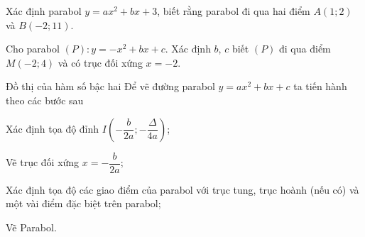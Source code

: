 \begin{vd}%
	Xác định parabol $y=ax^2+bx+3$, biết rằng parabol đi qua hai điểm $A(1;2)$ và $B(-2;11)$.
\end{vd}
\begin{vd}%
	Cho parabol $(P)\colon y=-x^2+bx+c$. Xác định $b$, $c$ biết $(P)$ đi qua điểm $M(-2;4)$ và có trục đối xứng $x=-2$.
\end{vd}
\begin{dang}{Đồ thị của hàm số bậc hai}
Để vẽ đường parabol $y=ax^2+bx+c$ ta tiến hành theo các bước sau
\begin{enumEX}{1}
\item Xác định tọa độ đỉnh $I\left(-\dfrac{b}{2a};-\dfrac{\Delta}{4a}\right)$;
\item Vẽ trục đối xứng $x=-\dfrac{b}{2a}$;
\item Xác định tọa độ các giao điểm của parabol với trục tung, trục hoành (nếu có) và một vài điểm đặc biệt trên parabol; 
\item Vẽ Parabol.
\end{enumEX}
\end{dang}
